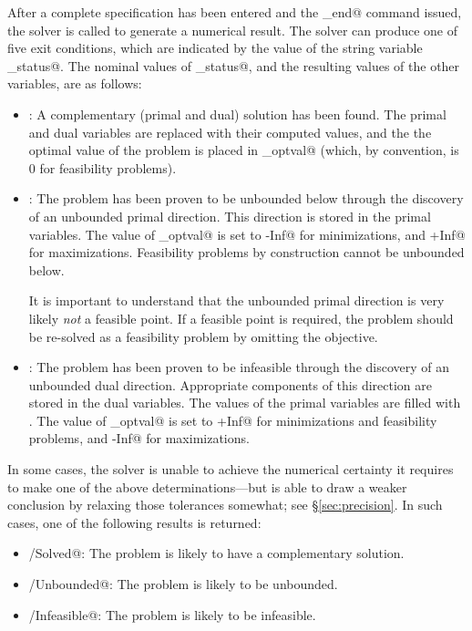 \documentclass[12pt]{article}
\begin{document}
After a complete \cvx specification has been entered and the \verb@cvx_end@ command 
issued, the solver is called to generate a numerical result. The solver can produce
one of five exit conditions, which are indicated by the value of the string variable
\verb@cvx_status@. The nominal values of \verb@cvx_status@, and the resulting 
values of the other variables, are as follows:
\begin{itemize}
	\item \verb@Solved@: A complementary (primal and dual)
solution has been found.
	      The primal and dual variables are replaced with their computed values, and the
	      the optimal value of the problem is placed in \verb@cvx_optval@ (which, by
	      convention, is $0$ for feasibility problems).
	\item \verb@Unbounded@: The problem has been proven to be unbounded below
	      through the discovery of an unbounded primal direction. This direction
	      is stored in the primal variables. The value of \verb@cvx_optval@
	      is set to \verb@-Inf@ for minimizations, and
	      \verb@+Inf@ for maximizations. Feasibility problems by construction
	      cannot be unbounded below.
	      
	      It is important to understand that the unbounded primal direction is very
	      likely \emph{not} a feasible point. If a feasible point is required, the 
	      problem should be re-solved as a feasibility problem by omitting the objective.
	\item \verb@Infeasible@: The problem has been proven to be infeasible
	      through the discovery of an unbounded dual direction. Appropriate
	      components of this direction are stored in the dual variables. The values of the
	      primal variables are filled with \verb@NaN@s. The value of \verb@cvx_optval@
	      is set to \verb@+Inf@ for minimizations and feasibility problems,
	      and \verb@-Inf@ for maximizations.
\end{itemize}
In some cases, the solver is unable to achieve the numerical certainty it requires to
make one of the above determinations---but is able to draw a weaker conclusion
by relaxing those tolerances somewhat; see \S\ref{sec:precision}. 
In such cases, one of the following
results is returned:
\begin{itemize}
	\item \verb@Inaccurate/Solved@: The problem is likely to have 
a complementary solution.
	\item \verb@Inaccurate/Unbounded@: The problem is likely to be unbounded.
	\item \verb@Inaccurate/Infeasible@: The problem is likely to be infeasible.
\end{itemize}
\end{document}
